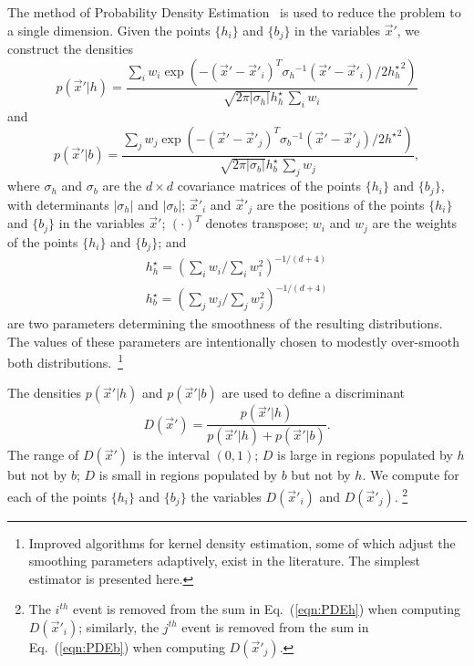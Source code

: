 \documentclass[twocolumn,twoside,prd]{revtex4} %
\newcommand {\footnoteParenthetical}[1]{\footnote{#1}}
\newcommand {\abs}[1]{\left| #1 \right|}
\begin{document}
The method of Probability Density Estimation~\cite{PDE} is used to reduce the problem to a single dimension.  Given the points $\{ h_i \}$ and $\{ b_j \}$ in the variables $\vec{x}'$, we construct the densities
\begin{equation}
\label{eqn:PDEh}
p(\vec{x}'|h) =   \frac{\sum_i{ w_i \exp{\left( - (\vec{x}'-\vec{x}'_i)^T {\sigma_h}^{-1} (\vec{x}'-\vec{x}'_i) / 2 {h^\star_h}^2 \right)}}}{\sqrt{2 \pi \abs{\sigma_h}} h^\star_h \, { \sum_i{w_i} }}
\end{equation}
and
\begin{equation}
\label{eqn:PDEb} 
p(\vec{x}'|b) =  \frac{\sum_j{ w_j \exp{\left( - (\vec{x}'-\vec{x}'_j)^T {\sigma_b}^{-1} (\vec{x}'-\vec{x}'_j) / 2 {h^\star}^2 \right)}}}{\sqrt{2 \pi \abs{\sigma_b}} h^\star_b \, { \sum_j{w_j} }},
\end{equation}
where $\sigma_h$ and $\sigma_b$ are the $d \times d$ covariance matrices of the points $\{ h_i \}$ and $\{ b_j \}$, with determinants $\abs{\sigma_h}$ and $\abs{\sigma_b}$; $\vec{x}'_i$ and $\vec{x}'_j$ are the positions of the points $\{ h_i \}$ and $\{ b_j \}$ in the variables $\vec{x}'$; $(\cdot)^T$ denotes transpose; $w_i$ and $w_j$ are the weights of the points $\{ h_i \}$ and $\{ b_j \}$; and 
\begin{gather}
h^\star_h = (\sum_i{w_i} / \sum_i{w_i^2})^{-1/(d+4)} \\ 
h^\star_b = (\sum_j{w_j} / \sum_j{w_j^2})^{-1/(d+4)}
\end{gather} 
\cite{Scott,Wand} are two parameters determining the smoothness of the resulting distributions.  The values of these parameters are intentionally chosen to modestly over-smooth both distributions.~\footnoteParenthetical{Improved algorithms for kernel density estimation, some of which adjust the smoothing parameters adaptively, exist in the literature.  The simplest estimator is presented here.}

The densities $p(\vec{x}'|h)$ and $p(\vec{x}'|b)$ are used to define a discriminant
\begin{equation}
\label{eqn:Discriminant}
D(\vec{x}') = \frac{ p(\vec{x}'|h) }{ p(\vec{x}'|h) + p(\vec{x}'|b) }.
\end{equation}
The range of $D(\vec{x}')$ is the interval $(0,1)$; $D$ is large in regions populated by $h$ but not by $b$; $D$ is small in regions populated by $b$ but not by $h$.  We compute for each of the points $\{ h_i \}$ and $\{ b_j \}$ the variables $D(\vec{x}'_i)$ and $D(\vec{x}'_j)$. \footnoteParenthetical{The $i^{th}$ event is removed from the sum in Eq.~(\ref{eqn:PDEh}) when computing $D(\vec{x}'_i)$; similarly, the $j^{th}$ event is removed from the sum in Eq.~(\ref{eqn:PDEb}) when computing $D(\vec{x}'_j)$.}
\end{document}
